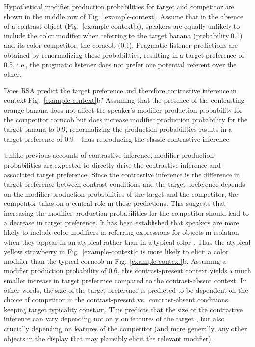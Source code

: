 \documentclass[10pt,letterpaper]{article}
\newcommand{\figref}[1]{Fig.~\ref{#1}}
\begin{document}
Hypothetical modifier production probabilities for target and competitor are shown in the middle row of \figref{example-context}. 
Assume that in the absence of a contrast object (\figref{example-context}a), speakers are equally unlikely to include the color modifier when referring to the target banana (probability 0.1) and its color competitor, the corncob (0.1). Pragmatic listener predictions are obtained by renormalizing these probabilities, resulting in a target preference of 0.5, i.e., the pragmatic listener does not prefer one potential referent over the other.

Does RSA predict the target preference and therefore contrastive inference in context \figref{example-context}b? Assuming that the presence of the contrasting orange banana does not affect the speaker's modifier production probability for the competitor corncob but does increase modifier production probability for the target banana to 0.9, renormalizing the production probabilities results in a target preference of 0.9 -- thus reproducing the classic contrastive inference.

Unlike previous accounts of contrastive inference, modifier production probabilities are expected to directly drive the contrastive inference and associated target preference. Since the contrastive inference is the difference in target preference between contrast conditions and the target preference depends on the modifier production probabilities of the target and the competitor, the competitor takes on a central role in these predictions. This suggests that increasing the modifier production probabilities for the competitor should lead to a decrease in target preference. It has been established that speakers are more likely to include color modifiers in referring expressions for objects in isolation when they appear in an atypical rather than in a typical color \cite{Rubio-Fernandez:2016,Westerbeek:2015,Degen:2020}. Thus the atypical yellow strawberry in \figref{example-context}c is more likely to elicit a color modifier than the typical corncob in \figref{example-context}b. Assuming a modifier production probability of 0.6, this contrast-present context yields a much smaller increase in target preference compared to the contrast-absent context. In other words, the size of the target preference is predicted to be dependent on the choice of competitor in the contrast-present vs.~contrast-absent conditions, keeping target typicality constant. This predicts that the size of the contrastive inference can vary depending not only on features of the target \cite<as previously shown by>{Sedivy:2003, Rubio-Fernandez:2019}, but also crucially depending on features of the competitor (and more generally, any other objects in the display that may plausibly elicit the relevant modifier).
\end{document}
